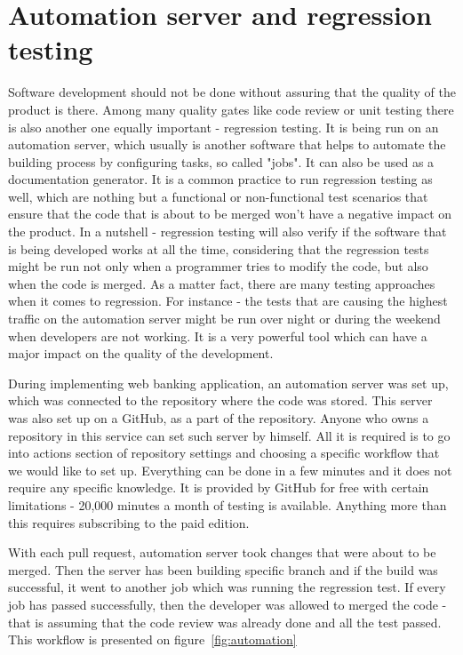 \documentclass[a4paper,12pt]{book}
\newcommand\tab[1][1cm]{\hspace*{#1}}
\begin{document}
\section{Automation server and regression testing}
{
\tab Software development should not be done without assuring that the quality of the product is there. Among many quality gates like code review or unit testing there is also another one equally important - regression testing. It is being run on an automation server, which usually is another software that helps to automate the building process by configuring tasks, so called "jobs". It can also be used as a documentation generator. It is a common practice to run regression testing as well, which are nothing but a functional or non-functional test scenarios that ensure that the code that is about to be merged won't have a negative impact on the product. In a nutshell - regression testing will also verify if the software that is being developed works at all the time, considering that the regression tests might be run not only when a programmer tries to modify the code, but also when the code is merged. As a matter fact, there are many testing approaches when it comes to regression. For instance - the tests that are causing the highest traffic on the automation server might be run over night or during the weekend when developers are not working. It is a very powerful tool which can have a major impact on the quality of the development.

\bigskip During implementing web banking application, an automation server was set up, which was connected to the repository where the code was stored. This server was also set up on a GitHub, as a part of the repository. Anyone who owns a repository in this service can set such server by himself. All it is required is to go into actions section of repository settings and choosing a specific workflow that we would like to set up. Everything can be done in a few minutes and it does not require any specific knowledge. It is provided by GitHub for free with certain limitations - 20,000 minutes a month of testing is available. Anything more than this requires subscribing to the paid edition.  

\bigskip With each pull request, automation server took changes that were about to be merged. Then the server has been building specific branch and if the build was successful, it went to another job which was running the regression test. If every job has passed successfully, then the developer was allowed to merged the code - that is assuming that the code review was already done and all the test passed. This workflow is presented on figure~\ref{fig:automation}

}
\end{document}

